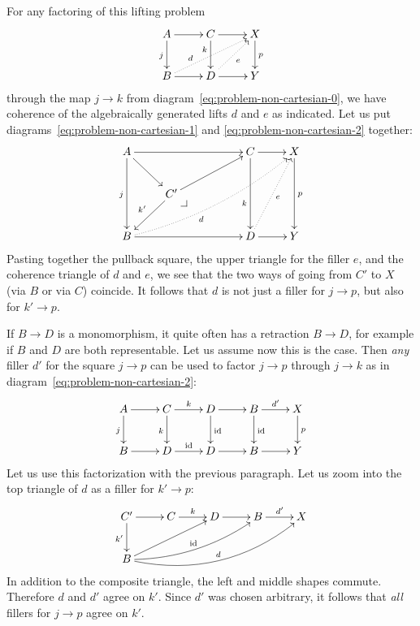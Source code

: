 \documentclass[reqno,10pt,a4paper,oneside]{amsart}
\begin{document}
For any factoring of this lifting problem
\begin{equation}
\label{eq:problem-non-cartesian-2}
\begin{gathered}
\xymatrix{
  A
  \ar[r]
  \ar[d]_{j}
&
  C
  \ar[r]
  \ar[d]_(0.35){k}
&
  X
  \ar[d]^{p}
\\
  B
  \ar[r]
  \ar@{.>}[urr]^(0.3){d}
&
  D
  \ar[r]
  \ar@{.>}[ur]_{e}
&
  Y
}
\end{gathered}
\end{equation}
through the map $j \to k$ from diagram~\eqref{eq:problem-non-cartesian-0}, we have coherence of the algebraically generated lifts $d$ and $e$ as indicated.
Let us put diagrams~\eqref{eq:problem-non-cartesian-1} and \eqref{eq:problem-non-cartesian-2} together:
\begin{equation}
\label{eq:problem-non-cartesian-3}
\begin{gathered}
\xymatrix{
  A
  \ar[rrr]
  \ar[dd]_{j}
  \ar[dr]
&&&
  C
  \ar[r]
  \ar[dd]_(0.6){k}
&
  X
  \ar[dd]^{p}
\\&
  C'
  \ar[urr]
  \ar[dl]_{k'}
  \pullback{dr}
\\
  B
  \ar[rrr]
  \ar@{.>}@/_1em/[uurrrr]_(0.4){d}
&&&
  D
  \ar[r]
  \ar@{.>}[uur]_{e}
&
  Y
}
\end{gathered}
\end{equation}
Pasting together the pullback square, the upper triangle for the filler $e$, and the coherence triangle of $d$ and $e$, we see that the two ways of going from $C'$ to $X$ (via $B$ or via $C$) coincide.
It follows that $d$ is not just a filler for $j \to p$, but also for $k' \to p$.

If $B \to D$ is a monomorphism, it quite often has a retraction $B \to D$, for example if $B$ and $D$ are both representable.
Let us assume now this is the case.
Then \emph{any} filler $d'$ for the square $j \to p$ can be used to factor $j \to p$ through $j \to k$ as in diagram~\eqref{eq:problem-non-cartesian-2}:
\[
\xymatrix{
  A
  \ar[r]
  \ar[d]_{j}
&
  C
  \ar[r]^{k}
  \ar[d]_{k}
&
  D
  \ar[r]
  \ar[d]^{\id}
&
  B
  \ar[r]^{d'}
  \ar[d]^{\id}
&
  X
  \ar[d]^{p}
\\
  B
  \ar[r]
&
  D
  \ar[r]^{\id}
&
  D
  \ar[r]
&
  B
  \ar[r]
&
  Y
}
\]
Let us use this factorization with the previous paragraph.
Let us zoom into the top triangle of $d$ as a filler for $k' \to p$:
\[
\xymatrix{
  C'
  \ar[r]
  \ar[d]_{k'}
&
  C
  \ar[r]^{k}
&
  D
  \ar[r]
&
  B
  \ar[r]^{d'}
&
  X
\\
  B
  \ar[urr]
  \ar@/_1em/[urrr]^{\id}
  \ar@/_2em/[urrrr]^{d}
}
\]
In addition to the composite triangle, the left and middle shapes commute.
Therefore $d$ and $d'$ agree on $k'$.
Since $d'$ was chosen arbitrary, it follows that \emph{all} fillers for $j \to p$ agree on $k'$.
\end{document}
